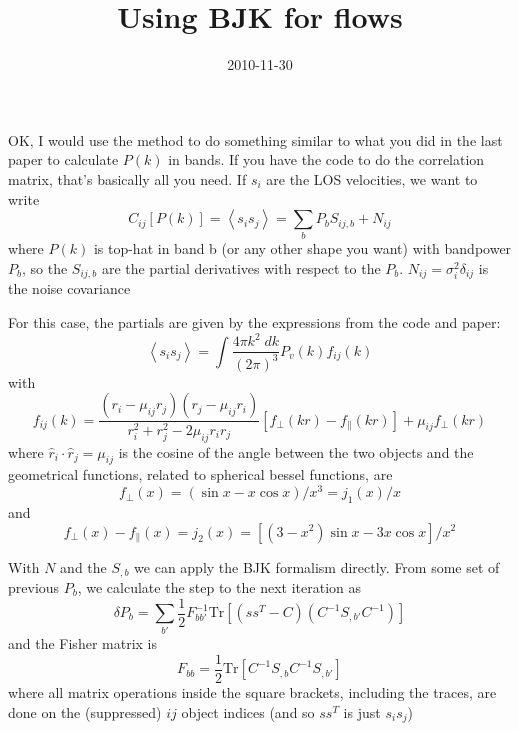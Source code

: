 \documentclass[]{article}
\title{Using BJK for flows}
\author{  }
\date{2010-11-30}
\begin{document}
\ifpdf
{}
\else
{}
\fi

\maketitle

% 
% 

   OK, I would use the method to do something similar to what you did in the last paper to calculate $P(k)$ in bands. If you have the code to do the correlation matrix, that's basically all you need.  If $s_i$ are the LOS velocities, we want to write
\begin{equation}
    C_{ij}[P(k)] = \left<s_i s_j\right> = \sum_b  P_b S_{ij,b} + N_{ij}
\end{equation}
where $P(k)$ is top-hat in band b (or any other shape you want) with bandpower $P_b$, so the $S_{ij,b}$ are the partial derivatives with respect to the $P_b$. $N_{ij} = \sigma^2_i \delta_{ij}$ is the noise covariance

For this case, the partials are given by the expressions from the code and paper:
\begin{equation}
    \left<s_i s_j\right> = \int \frac{4\pi k^2\;dk}{(2\pi)^3} P_v(k)f_{ij}(k)
\end{equation}
with
\begin{equation}
    f_{ij}(k) = 
    \frac{(r_i - \mu_{ij} r_j)(r_j-\mu_{ij} r_i)}{r_i^2 + r_j^2-2\mu_{ij} r_i r_j}
       \left[f_\perp(kr)-f_\parallel(kr)\right]
       +\mu_{ij} f_\perp(kr)
\end{equation}
where ${\hat r_i}\cdot{\hat r}_j=\mu_{ij}$ is the cosine of the angle between the two objects and the geometrical functions, related to spherical bessel functions, are
\begin{equation}
    f_\perp(x)= (\sin x - x \cos x)/x^3 = j_1(x)/x
\end{equation}
and 
\begin{equation}
    f_\perp(x) - f_\parallel(x) = j_2(x) = \left[(3-x^2)\sin x - 3x\cos x\right]/x^2
\end{equation}

With $N$ and the $S_{,b}$ we can apply the BJK formalism directly. From some set of previous $P_b$, we calculate the step to the next iteration as
\begin{equation}
    \delta P_b = \sum_{b'}\frac12F^{-1}_{bb'}\mathrm{Tr}\left[(ss^T-C)(C^{-1}S_{,b'}C^{-1})\right]
\end{equation}
and the Fisher matrix is
\begin{equation}
    F_{bb}= \frac12\textrm{Tr}\left[C^{-1}S_{,b}C^{-1}S_{,b'}\right]
\end{equation}
where all matrix operations inside the square brackets, including the traces, are done on the (suppressed) $ij$ object indices (and so $ss^T$ is just $s_i s_j$)



\end{document}
